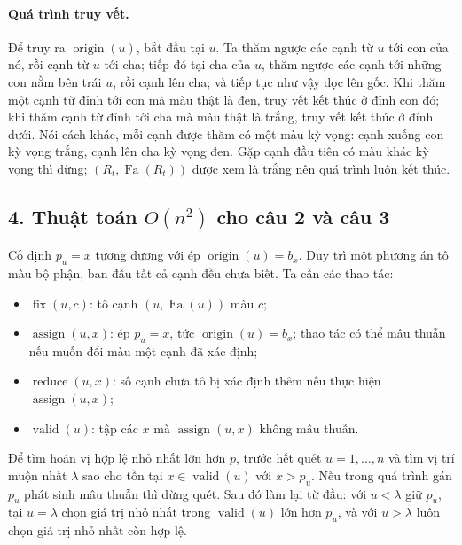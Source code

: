 \documentclass[11pt]{article}
\begin{document}
\paragraph{Quá trình truy vết.}
Để truy ra \(\operatorname{origin}(u)\), bắt đầu tại \(u\). Ta thăm ngược các
cạnh từ \(u\) tới con của nó, rồi cạnh từ \(u\) tới cha; tiếp đó tại cha của
\(u\), thăm ngược các cạnh tới những con nằm bên trái \(u\), rồi cạnh lên cha;
và tiếp tục như vậy dọc lên gốc. Khi thăm một cạnh từ đỉnh tới con mà màu thật
là đen, truy vết kết thúc ở đỉnh con đó; khi thăm cạnh từ đỉnh tới cha mà màu
thật là trắng, truy vết kết thúc ở đỉnh dưới. Nói cách khác, mỗi cạnh được
thăm có một màu kỳ vọng: cạnh xuống con kỳ vọng trắng, cạnh lên cha kỳ vọng
đen. Gặp cạnh đầu tiên có màu khác kỳ vọng thì dừng; \((R_t,\operatorname{Fa}(R_t))\)
được xem là trắng nên quá trình luôn kết thúc.

\subsection*{4. Thuật toán \(O(n^2)\) cho câu 2 và câu 3}

Cố định \(p_u=x\) tương đương với ép
\(\operatorname{origin}(u)=b_x\). Duy trì một phương án tô màu bộ phận, ban đầu
tất cả cạnh đều chưa biết. Ta cần các thao tác:

\begin{itemize}
  \item \(\operatorname{fix}(u,c)\): tô cạnh \((u,\operatorname{Fa}(u))\) màu
  \(c\);
  \item \(\operatorname{assign}(u,x)\): ép \(p_u=x\), tức
  \(\operatorname{origin}(u)=b_x\); thao tác có thể mâu thuẫn nếu muốn đổi màu
  một cạnh đã xác định;
  \item \(\operatorname{reduce}(u,x)\): số cạnh chưa tô bị xác định thêm nếu
  thực hiện \(\operatorname{assign}(u,x)\);
  \item \(\operatorname{valid}(u)\): tập các \(x\) mà
  \(\operatorname{assign}(u,x)\) không mâu thuẫn.
\end{itemize}

Để tìm hoán vị hợp lệ nhỏ nhất lớn hơn \(p\), trước hết quét \(u=1,\ldots,n\)
và tìm vị trí muộn nhất \(\lambda\) sao cho tồn tại \(x\in\operatorname{valid}(u)\)
với \(x>p_u\). Nếu trong quá trình gán \(p_u\) phát sinh mâu thuẫn thì dừng
quét. Sau đó làm lại từ đầu: với \(u<\lambda\) giữ \(p_u\), tại
\(u=\lambda\) chọn giá trị nhỏ nhất trong \(\operatorname{valid}(u)\) lớn hơn
\(p_u\), và với \(u>\lambda\) luôn chọn giá trị nhỏ nhất còn hợp lệ.
\end{document}
